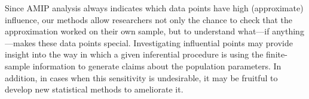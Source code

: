 Since AMIP analysis always indicates which data points have high (approximate)
influence, our methods allow researchers not only the chance to check that the
approximation worked on their own sample, but to understand what---if
anything---makes these data points special. Investigating influential points may
provide insight into the way in which a given inferential procedure is using the
finite-sample information to generate claims about the population parameters. In
addition, in cases when this sensitivity is undesirable, it may be fruitful to
develop new statistical methods to ameliorate it.
